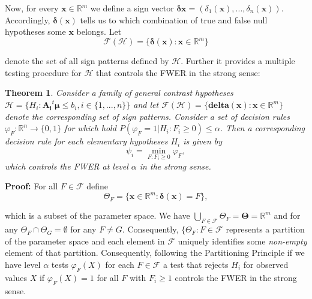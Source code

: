\documentclass[a4paper,12pt]{article}
\newtheorem{theorem}{Theorem}
\newenvironment{proof}[1][Proof]{\noindent\textbf{#1:} }{}
\newcommand{\bs}[1]{\boldsymbol{#1}}
\newcommand{\R}{\mathbb{R}}
\begin{document}
Now, for every $\bs{x} \in \mathbb{R}^m$ we define a sign vector
$\bs{\delta}{\bs{x}}=
(\delta_1(\bs{x}),...,\delta_n(\bs{x}))$. Accordingly,
$\bs{\delta}(\bs{x})$ tells us to which 
combination of true and false null hypotheses some $\bs{x}$
belongs. Let
\begin{equation}
\label{eq:faces}
\mathcal{F}(\mathscr{H}) = \{\bs{\delta}(\bs{x}): \bs{x} \in \R^m\}
\end{equation}

denote the set of all sign patterns defined by 
$\mathscr{H}$.  Further it
provides a multiple testing procedure for $\mathscr{H}$ that controls
the FWER in the strong sense:

\begin{theorem}
  Consider a family of general contrast hypotheses $\mathscr{H} =
  \{H_i: \bs{A_i}^t\bs{\mu} \leq b_i,i \in \{1,...,n\}\}$ and let
  $\mathscr{F}(\mathscr{H}) = \{ \bs{delta}(\bs{x}): \bs{x} \in
  \R^m\}$ denote the corresponding set of sign patterns. Consider a
  set of decision rules $\varphi_F: \R^n \rightarrow \{0,1\}$ for
  which hold $P(\varphi_F = 1 | H_i: F_i \geq 0) \leq \alpha$. Then a
  corresponding decision rule for each elementary hypotheses $H_i$ is
  given by 
  \begin{equation}
    \label{eq:signtest}
    \psi_i = \min_{F: F_i \geq 0} \varphi_F,
  \end{equation}
  which controls the FWER at level $\alpha$ in the strong sense. 
\end{theorem}


\begin{proof}
  For all $F \in \mathcal{F}$ define
  \begin{equation}
    \label{eq:partition}
    \Theta_F = \{\bs{x} \in \R^m: \bs{\delta}(\bs{x}) = F\},
  \end{equation}

  which is a subset of the parameter space. We have $\bigcup_{F \in
    \mathcal{F}} \Theta_F = \bs{\Theta} = \R^m$ and for any $\Theta_F
  \cap \Theta_G = \emptyset$ for any $F \neq G$. Consequently,
  $\{\Theta_F:F \in \mathcal{F}$ represents a partition of the
  parameter space and each element in $\mathcal{F}$ uniquely
  identifies some {\em non-empty} element of that
  partition. Consequently, following the Partitioning Principle
  \cite[]{finner2002partitioning} if we have level $\alpha$ tests
  $\varphi_F(X)$ for each $F \in \mathcal{F}$ a test that rejects
  $H_i$ for observed values $X$ if $\varphi_F(X) = 1$ for all $F$ with
  $F_i \geq 1$ controls the FWER in the strong sense.
\end{proof}
\end{document}
